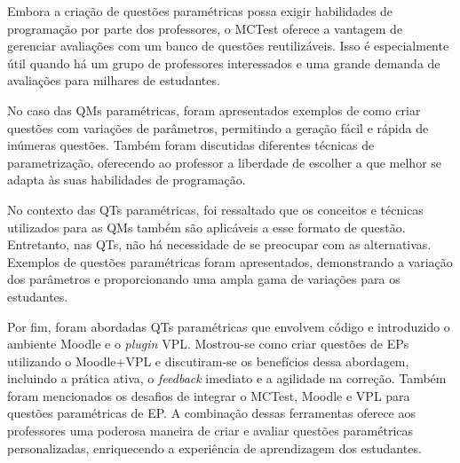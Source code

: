 Embora a criação de questões paramétricas possa exigir habilidades de programação por parte dos professores, o MCTest oferece a vantagem de gerenciar avaliações com um banco de questões reutilizáveis. Isso é especialmente útil quando há um grupo de professores interessados e uma grande demanda de avaliações para milhares de estudantes. 

No caso das QMs paramétricas, foram apresentados exemplos de como criar questões com variações de parâmetros, permitindo a geração fácil e rápida de inúmeras questões. Também foram discutidas diferentes técnicas de parametrização, oferecendo ao professor a liberdade de escolher a que melhor se adapta às suas habilidades de programação.

No contexto das QTs paramétricas, foi ressaltado que os conceitos e técnicas utilizados para as QMs também são aplicáveis a esse formato de questão. Entretanto, nas QTs, não há necessidade de se preocupar com as alternativas. Exemplos de questões paramétricas foram apresentados, demonstrando a variação dos parâmetros e proporcionando uma ampla gama de variações para os estudantes.

Por fim, foram abordadas QTs paramétricas que envolvem código e introduzido o ambiente Moodle e o \textit{plugin} VPL. Mostrou-se como criar questões de EPs utilizando o Moodle+VPL e discutiram-se os benefícios dessa abordagem, incluindo a prática ativa, o \textit{feedback} imediato e a agilidade na correção. Também foram mencionados os desafios de integrar o MCTest, Moodle e VPL para questões paramétricas de EP. A combinação dessas ferramentas oferece aos professores uma poderosa maneira de criar e avaliar questões paramétricas personalizadas, enriquecendo a experiência de aprendizagem dos estudantes.